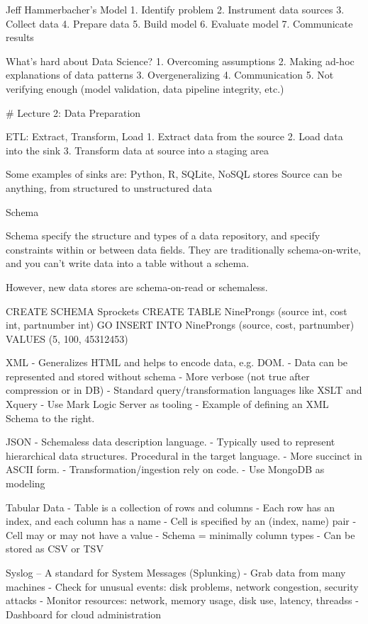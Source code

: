 \documentclass[3pt,landscape]{article}
\begin{document}
\begin{multicols}{3}
Jeff Hammerbacher’s Model
1. Identify problem
2. Instrument data sources
3. Collect data
4. Prepare data
5. Build model
6. Evaluate model
7. Communicate results

What’s hard about Data Science?
1. Overcoming assumptions
2. Making ad-hoc explanations of data patterns
3. Overgeneralizing
4. Communication
5. Not verifying enough (model validation, data pipeline integrity, etc.)

\# Lecture 2: Data Preparation

ETL: Extract, Transform, Load
1. Extract data from the source
2. Load data into the sink
3. Transform data at source into a staging area

Some examples of sinks are: Python, R, SQLite, NoSQL stores
Source can be anything, from structured to unstructured data

Schema

Schema specify the structure and types of a data repository, and specify constraints within or between data fields. They are traditionally schema-on-write, and you can’t write data into a table without a schema.

However, new data stores are schema-on-read or schemaless.

    CREATE SCHEMA Sprockets
    CREATE TABLE NineProngs (source int, cost int, partnumber int) GO
    INSERT INTO NineProngs (source, cost, partnumber) VALUES (5, 100, 45312453)

 XML
- Generalizes HTML and helps to encode data, e.g. DOM.
- Data can be represented and stored without schema
- More verbose (not true after compression or in DB)
- Standard query/transformation languages like XSLT and Xquery
- Use Mark Logic Server as tooling
- Example of defining an XML Schema to the right. 
 

 JSON
- Schemaless data description language. 
- Typically used to represent hierarchical data structures. Procedural in the target language.
- More succinct in ASCII form.
- Transformation/ingestion rely on code.
- Use MongoDB as modeling

Tabular Data
- Table is a collection of rows and columns
- Each row has an index, and each column has a name
- Cell is specified by an (index, name) pair
- Cell may or may not have a value
- Schema = minimally column types
- Can be stored as CSV or TSV

Syslog – A standard for System Messages (Splunking)
- Grab data from many machines
- Check for unusual events: disk problems, network congestion, security attacks
- Monitor resources: network, memory usage, disk use, latency, threadss
- Dashboard for cloud administration


\end{multicols}
\end{document}
